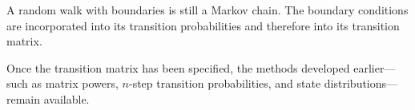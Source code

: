 \documentclass[
  letterpaper,
  DIV=11,
  numbers=noendperiod]{scrartcl}
\theoremstyle{definition}
\theoremstyle{remark}
\begin{document}
\begin{tcolorbox}[enhanced jigsaw, arc=.35mm, bottomrule=.15mm, bottomtitle=1mm, breakable, colback=white, colbacktitle=quarto-callout-note-color!10!white, colframe=quarto-callout-note-color-frame, coltitle=black, left=2mm, leftrule=.75mm, opacityback=0, opacitybacktitle=0.6, rightrule=.15mm, title=\textcolor{quarto-callout-note-color}{\faInfo}\hspace{0.5em}{Key idea}, titlerule=0mm, toprule=.15mm, toptitle=1mm]

A random walk with boundaries is still a Markov chain. The boundary
conditions are incorporated into its transition probabilities and
therefore into its transition matrix.

Once the transition matrix has been specified, the methods developed
earlier---such as matrix powers, \(n\)-step transition probabilities,
and state distributions---remain available.

\end{tcolorbox}
\end{document}
